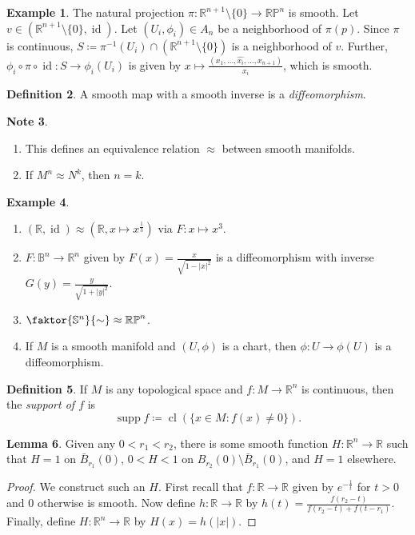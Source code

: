 \documentclass[10pt,letterpaper,cm]{nupset}
\theoremstyle{definition}
\newtheorem{definition}{Definition}[subsection]
\newtheorem{exmp}[definition]{Example}
\newtheorem{note}[definition]{Note}
\theoremstyle{theorem}
\newtheorem{lemma}[definition]{Lemma}
\theoremstyle{remark}
\newcommand{\R}{\mathbb R}
\newcommand{\RP}{\mathbb{RP}}
\renewcommand{\S}{\mathbb S}
\newcommand{\B}{\mathbb{B}}
\newcommand{\1}{\mathbf{1}}
\newcommand{\0}{\vec 0}
\DeclareMathOperator{\id}{id}
\DeclareMathOperator{\supp}{supp}
\DeclareMathOperator{\cl}{cl}
\begin{document}
\begin{exmp}
The natural projection $\pi : \R^{n+1}\setminus \{0\} \to \RP^n$ is smooth. Let $v \in (\R^{n+1} \setminus \{0\}, \id)$. Let $(U_i, \phi_i) \in A_n$ be a neighborhood of $\pi(p)$. Since $\pi$ is continuous, $S \coloneqq  \pi^{-1}(U_i) \cap  (\R^{n+1} \setminus \{0\})$ is a neighborhood of $v$. Further, $\phi_i \circ \pi \circ \id : S \to \phi_i(U_i)$ is given by $x\mapsto \frac{(x_1, \ldots, \widehat{x_i}, \ldots, x_{n+1})}{x_i}$, which is smooth.
\end{exmp}

\begin{definition} 
A smooth map with a smooth inverse is a \textit{diffeomorphism}.
\end{definition}

\begin{note} $ $
\begin{enumerate}
\item This defines an equivalence relation $\approx$ between smooth manifolds. 
\item If $M^n \approx N^k$, then $n =k$.
\end{enumerate}
\end{note}


\begin{exmp} $ $
\begin{enumerate}
\item $(\R, \id) \approx (\R, x\mapsto x^{\frac{1}{3}})$ via $F: x \mapsto x^3$.
\item $F: \B^n \to \R^n$ given by $F(x) = \frac{x}{\sqrt{1-|x|^2}}$ is a diffeomorphism with inverse $G(y) = \frac{y}{\sqrt{1+|y|^2}}$.
\item  $\faktor{\S^n}{\sim} \approx \RP^n$.
\item If $M$ is a smooth manifold and $(U, \phi)$ is a chart, then $\phi: U \to \phi(U)$ is a diffeomorphism.
\end{enumerate}
\end{exmp}

\begin{definition}
If $M$ is any topological space and $f:M \to \R^n$ is continuous, then the \textit{support of $f$} is $$\supp f \coloneqq  \cl\left(\{x \in M: f(x) \ne 0\}\right).$$
\end{definition}

\begin{lemma}
Given any $0<r_1<r_2$, there is some smooth function $H: \R^n \to \R$ such that $H =1$ on $\bar{B}_{r_1}(0)$, $0<H <1$ on $B_{r_2}(0)\setminus \bar{B}_{r_1}(0)$, and $H=1$ elsewhere. 
\end{lemma}
\begin{proof}\label{l5}
We construct such an $H$. First recall that $f: \R \to \R$ given by $e^{-\frac{1}{t}}$ for $t>0$ and $0$ otherwise is smooth. Now define $h: \R \to \R$ by $h(t) = \frac{f(r_2-t)}{f(r_2-t)+ f(t-r_1)}$. Finally, define $H: \R^n \to \R$ by $H(x) = h(|x|)$.
\end{proof}
\end{document}
